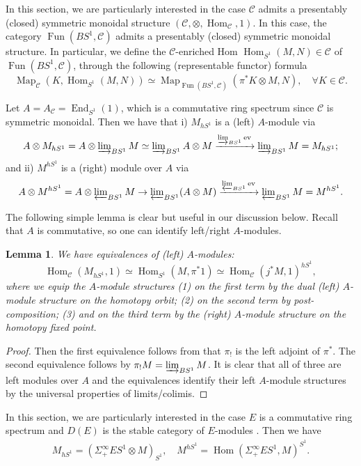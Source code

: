 \documentclass[11pt]{amsart}
\numberwithin{equation}{section}
\theoremstyle{plain}
\newtheorem{Lemma}[lemma]{Lemma}
\theoremstyle{definition}
\theoremstyle{remark}
\newcommand{\cC} { {\mathcal{C}}}
\newcommand\End{\operatorname{End}}
\newcommand\Fun{\operatorname{Fun}}
\newcommand\Hom{\operatorname{Hom}}
\newcommand{\Map}{{\operatorname{Map}}}
\begin{document}
In this section, we are particularly interested in the case $\cC$ admits a presentably (closed) symmetric monoidal structure $(\cC,\otimes,\Hom_\cC,1)$. In this case, the category $\Fun(BS^1,\cC)$ admits a presentably (closed) symmetric monoidal structure.
In particular, we define the $\cC$-enriched Hom $\Hom_{S^1}(M,N)\in \cC$ of $\Fun(BS^1,\cC)$, through the following (representable functor) formula
\[\Map_{\cC}(K,\Hom_{S^1}(M,N))\simeq \Map_{\Fun(BS^1,\cC)}(\pi^*K\otimes M,N),\quad \forall K\in \cC.\]

Let $A=A_\cC=\End_{S^1}(1)$, which is a commutative ring spectrum since $\cC$ is symmetric monoidal. Then we have that i) $M_{hS^1}$ is a (left) $A$-module via 
\[A\otimes M_{hS^1}=A\otimes \varinjlim\nolimits_{BS^1}M\simeq \varinjlim\nolimits_{BS^1} A\otimes M \xrightarrow{\varinjlim_{BS^1} \operatorname{ev}} \varinjlim\nolimits_{BS^1}   M  =M_{hS^1}; \]and ii) $M^{hS^1}$ is a (right) module over $A$ via
\[A\otimes M^{hS^1}=A\otimes \varprojlim\nolimits_{BS^1}M
\rightarrow\varprojlim\nolimits_{BS^1}(A\otimes M)
\xrightarrow{\varprojlim_{BS^1}\operatorname{ev}}
\varprojlim\nolimits_{BS^1}M=M^{hS^1}.
\]


The following simple lemma is clear but useful in our discussion below. Recall that $A$ is commutative, so one can identify left/right $A$-modules.
\begin{Lemma}\label{lemma: linear dual of S1-action}We have  equivalences of (left) $A$-modules:
\[\Hom_\cC(M_{hS^1},1)\simeq \Hom_{S^1}(M,\pi^*1)\simeq \Hom_\cC(j^*M,1)^{hS^1}, \]
where we equip the $A$-module structures (1) on the first term by the dual (left) $A$-module structure on the homotopy orbit; (2) on the second term by post-composition; (3) and on the third term by the (right) $A$-module structure on the homotopy fixed point.
\end{Lemma}
\begin{proof}
Then the first equivalence follows from that $\pi_!$ is the left adjoint of $\pi^*$. The second equivalence follows by $\pi_!M=\varinjlim\nolimits_{BS^1}M$. It is clear that all of three are left modules over $A$ and the equivalences identify their left $A$-module structures by the universal properties of limits/colimis.
\end{proof}

In this section, we are particularly interested in the case $E$ is a commutative ring spectrum and $D(E)$ is the stable category of $E$-modules \cite[Section 7.1.1]{HA}. Then we have
\begin{align*}
    M_{hS^1}  = (\Sigma^\infty_+ES^1  \otimes M)_{S^1}, \quad 
    M^{hS^1} = \Hom(\Sigma^\infty_+ES^1, M)^{S^1}.
\end{align*}
\end{document}
